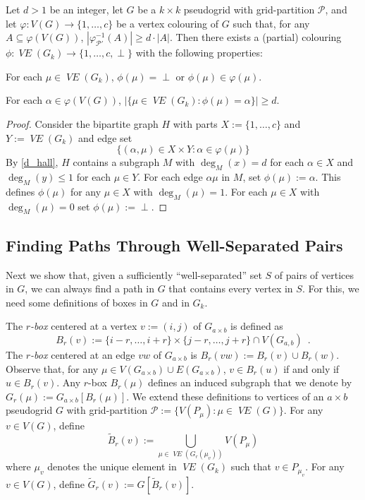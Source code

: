 \documentclass{patmorin}
\newcommand{\defin}[1]{\emph{\color{brown}#1}}
\DeclareMathOperator{\VE}{\mathit{VE}}
\begin{document}
\begin{lem}\label{one_colour_per_object}
  Let $d>1$ be an integer, let $G$ be a $k\times k$ pseudogrid with grid-partition $\mathcal{P}$, and let $\varphi:V(G)\to\{1,\ldots,c\}$ be a vertex colouring of $G$ such that, for any $A\subseteq\varphi(V(G))$, $|\varphi_{\mathcal{P}'}^{-1}(A)| \ge d\cdot|A|$. Then there exists a (partial) colouring $\phi:\VE(G_{k})\to\{1,\ldots,c,\perp\}$ with the following properties:
  \begin{compactenum}[(i)]
    \item For each $\mu\in\VE(G_{k})$, $\phi(\mu)=\perp$ or $\phi(\mu)\in\varphi(\mu)$.
    \item For each $\alpha\in\varphi(V(G))$, $|\{\mu\in\VE(G_{k}):\phi(\mu)=\alpha\}|\ge d$.
  \end{compactenum}
\end{lem}

\begin{proof}
  Consider the bipartite graph $H$ with parts $X:=\{1,\ldots,c\}$ and $Y:=\VE(G_k)$ and edge set
  \[
    \{ (\alpha,\mu)\in X\times Y: \alpha\in\varphi(\mu) \}
  \]
  By \cref{d_hall}, $H$ contains a subgraph $M$ with $\deg_M(x)=d$ for each $\alpha\in X$ and $\deg_M(y)\le 1$ for each $\mu\in Y$.  For each edge $\alpha\mu$ in $M$, set $\phi(\mu):=\alpha$.  This defines $\phi(\mu)$ for any $\mu\in X$ with $\deg_M(\mu)=1$.  For each $\mu\in X$ with $\deg_M(\mu)=0$ set $\phi(\mu):=\perp$.
\end{proof}

\subsection{Finding Paths Through Well-Separated Pairs}

Next we show that, given a sufficiently ``well-separated'' set $S$ of pairs of vertices in $G$, we can always find a path in $G$ that contains every vertex in $S$. For this, we need some definitions of boxes in $G$ and in $G_k$.

The \defin{$r$-box} centered at a vertex $v:=(i,j)$ of $G_{a\times b}$ is defined as
\[
  B_r(v) := \{i-r,\ldots,i+r\}\times\{j-r,\ldots,j+r\} \cap V(G_{a,b}) \enspace .
\]
The \defin{$r$-box} centered at an edge $vw$ of $G_{a\times b}$ is $B_r(vw):=B_r(v)\cup B_r(w)$.  Observe that, for any $\mu\in V(G_{a\times b})\cup E(G_{a\times b})$,  $v\in B_r(u)$ if and only if $u\in B_r(v)$.  Any $r$-box $B_r(\mu)$ defines an induced subgraph that we denote by $G_r(\mu):=G_{a\times b}[B_r(\mu)]$.  We extend these definitions to vertices of an $a\times b$ pseudogrid $G$ with grid-partition $\mathcal{P}:=\{V(P_\mu):\mu\in\VE(G)\}$. For any $v\in V(G)$, define
\[
   \tilde{B}_r(v) := \bigcup_{\mu\in \VE(G_r(\mu_v))} V(P_\mu)
\]
where $\mu_v$ denotes the unique element in $\VE(G_k)$ such that $v\in P_{\mu_v}$.
For any $v\in V(G)$, define $\tilde{G}_r(v):=G[\tilde{B}_r(v)]$.
\end{document}

